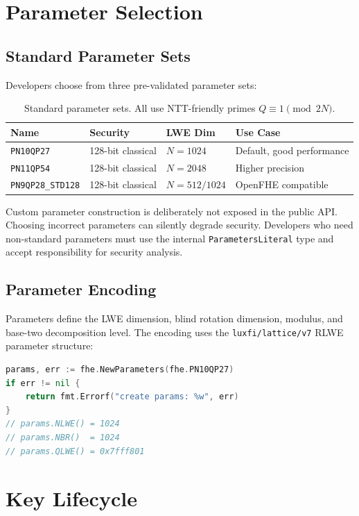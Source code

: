 \documentclass[11pt]{article}
\begin{document}
\section{Parameter Selection}

\subsection{Standard Parameter Sets}

Developers choose from three pre-validated parameter sets:

\begin{table}[h]
\centering
\begin{tabular}{@{}llll@{}}
\toprule
\textbf{Name} & \textbf{Security} & \textbf{LWE Dim} & \textbf{Use Case} \\
\midrule
\texttt{PN10QP27} & 128-bit classical & $N=1024$ & Default, good performance \\
\texttt{PN11QP54} & 128-bit classical & $N=2048$ & Higher precision \\
\texttt{PN9QP28\_STD128} & 128-bit classical & $N=512/1024$ & OpenFHE compatible \\
\bottomrule
\end{tabular}
\caption{Standard parameter sets. All use NTT-friendly primes $Q \equiv 1 \pmod{2N}$.}
\label{tab:params}
\end{table}

Custom parameter construction is deliberately not exposed in the public API. Choosing incorrect parameters can silently degrade security. Developers who need non-standard parameters must use the internal \texttt{ParametersLiteral} type and accept responsibility for security analysis.

\subsection{Parameter Encoding}

Parameters define the LWE dimension, blind rotation dimension, modulus, and base-two decomposition level. The encoding uses the \texttt{luxfi/lattice/v7} RLWE parameter structure:

\begin{lstlisting}[language=Go]
params, err := fhe.NewParameters(fhe.PN10QP27)
if err != nil {
    return fmt.Errorf("create params: %w", err)
}
// params.NLWE() = 1024
// params.NBR()  = 1024
// params.QLWE() = 0x7fff801
\end{lstlisting}

\section{Key Lifecycle}
\end{document}

